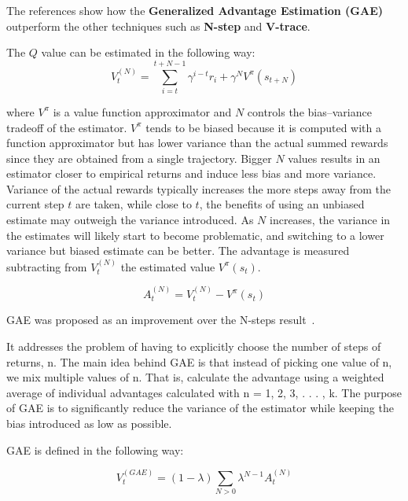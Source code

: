 \documentclass[11pt, a4paper, hidelinks]{report}
\begin{document}
The references show how the \textbf{Generalized Advantage Estimation (GAE)} outperform the other techniques such as \textbf{N-step} and \textbf{V-trace}.

The $Q$ value can be estimated in the following way:
\begin{equation}
	V_t^{(N)} = \sum_{i = t}^{t + N - 1} \gamma^{i - t}r_i + \gamma^{N}V^{\pi}(s_{t + N})\label{eq:N-step}
\end{equation}

where $V^{\pi}$ is a value function approximator and $N$ controls the bias–variance tradeoff of the estimator.
$V^{\pi}$ tends to be biased because it is computed with a function approximator but has lower variance than the actual summed rewards since they are obtained from a single trajectory.
Bigger $N$ values results in an estimator closer to empirical returns and induce less bias and more variance.
Variance of the actual rewards typically increases the more steps away from the current step $t$ are taken, while close to $t$, the benefits of using an unbiased estimate may outweigh the variance introduced.
As $N$ increases, the variance in the estimates will likely start to become problematic, and switching to a lower variance but biased estimate can be better.
The advantage is measured subtracting from $V_t^{(N)}$ the estimated value $V^{\pi}(s_t)$.

\begin{equation}
	A_t^{(N)} = V_t^{(N)} - V^{\pi}(s_t)\label{eq:N-step_advantage}
\end{equation}

GAE was proposed as an improvement over the N-steps result~\cite{gae}.

\begin{quoting}[font=itshape, begintext={"}, endtext={"\cite{graesser2019foundations}}]
It addresses the problem of having to explicitly choose the number of steps of returns, n.
The main idea behind GAE is that instead of picking one value of n, we mix multiple values of n.
That is, calculate the advantage using a weighted average of individual advantages calculated with n = 1, 2, 3, . . . , k.
The purpose of GAE is to significantly reduce the variance of the estimator while keeping the bias introduced as low as possible.
\end{quoting}

GAE is defined in the following way:

\begin{equation}
	V_t^{(GAE)} = (1 - \lambda)\sum_{N > 0} \lambda^{N - 1}A_t^{(N)}\label{eq:GAE}
\end{equation}
\end{document}
